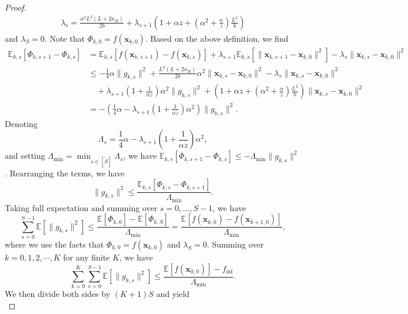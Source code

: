 \documentclass{article}
\newcommand{\bx}{\boldsymbol{x}}
\theoremstyle{plain}
\theoremstyle{definition}
\theoremstyle{remark}
\begin{document}
\begin{proof}
\begin{align*}
    \lambda_s = \frac{\alpha^2 L^2(L+ 2\kappa_H)}{2b} + \lambda_{s+1}\left(1+\alpha z+\left(\alpha^2 + \frac{\alpha}{ z}\right)\frac{ L^2}{b}\right)
\end{align*}
and $\lambda_S=0$. Note that $\Phi_{k,0} = f(\bx_{k,0})$.
Based on the above definition, we find
\begin{align*}
   \mathbb{E}_{k,s}[\Phi_{k,s+1} - \Phi_{k,s}] & = \mathbb{E}_{k,s}[f(\bx_{k,s+1}) - f(\bx_{k,s})] + \lambda_{s+1} \mathbb{E}_{k,s}[\|\bx_{k,s+1} - \bx_{k,0}\|^2] - \lambda_s\|\bx_{k,s} - \bx_{k,0}\|^2 \\
   & \leq -\frac{1}{4}\alpha\|g_{k,s}\|^2 + \frac{L^2(L + 2\kappa_H)}{2b} \alpha^2 \|\bx_{k,s} - \bx_{k,0}\|^2  - \lambda_s\|\bx_{k,s} - \bx_{k,0}\|^2 \\
   & \quad + \lambda_{s+1}\left(1+\frac{1}{\alpha z}\right)\alpha^2\|g_{k,s}\|^2 + \left(1+\alpha z+\left(\alpha^2 + \frac{\alpha}{ z}\right)\frac{ L^2}{b}\right) \|\bx_{k,s} - \bx_{k,0}\|^2\\
   & = -\left(\frac{1}{4}\alpha - \lambda_{s+1}\left(1+\frac{1}{\alpha z}\right)\alpha^2\right)\|g_{k,s}\|^2.
\end{align*}
Denoting
\begin{equation*}
    \Lambda_s = \frac{1}{4}\alpha - \lambda_{s+1}\left(1+\frac{1}{\alpha z}\right)\alpha^2, 
\end{equation*}
and setting $\Lambda_{\min} = \min_{s\in[\tilde{S}]} \Lambda_s$, we have $\mathbb{E}_{k,s} [\Phi_{k,s+1} - \Phi_{k,s}] \leq -\Lambda_{\min}\|g_{k,s}\|^2$. Rearranging the terms, we have
\begin{equation*}
\|g_{k,s}\|^2 \leq \frac{\mathbb{E}_{k,s}[\Phi_{k,s} - \Phi_{k,s+1}]}{\Lambda_{\min}}.
\end{equation*}
Taking full expectation and summing over $s = 0,\dots,S-1$, we have
\begin{equation*}
    \sum_{s=0}^{S-1}\mathbb{E}[\|g_{k,s}\|^2] \leq \frac{\mathbb{E}[\Phi_{k,0}] - \mathbb{E}[\Phi_{k,S}]}{\Lambda_{\min}} = \frac{\mathbb{E}[f(\bx_{k,0}) - f(\bx_{k+1,0})]}{\Lambda_{\min}}, 
\end{equation*}
where we use the facts that $\Phi_{k,0} = f(\bx_{k,0}) $ and $\lambda_S=0$. Summing over $k = 0,1,2,\cdots,K$ for any finite $K$, we have
\begin{equation*}
    \sum_{k=0}^K\sum_{s=0}^{S-1}\mathbb{E}[\|g_{k,s}\|^2] \leq \frac{\mathbb{E}[f(\bx_{0,0})] - f_{\inf}}{\Lambda_{\min}}.
\end{equation*}
We then divide both sides by $(K+1)S$ and yield
\begin{equation}\label{thm:conv}

\end{equation}
\end{proof}
\end{document}
